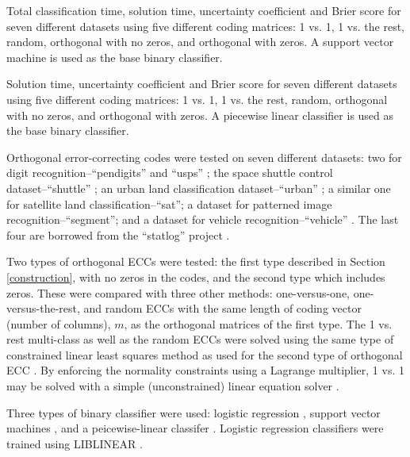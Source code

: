 \begin{table*}
\caption{Total classification time, solution time, uncertainty coefficient and Brier score for seven different datasets using five different coding matrices: 1 vs. 1, 1 vs. the rest, random, orthogonal with no zeros, and orthogonal with zeros. A support vector machine is used as the base binary classifier.}\label{class_results_svm}

\end{table*}

\begin{table*}
\caption{Solution time, uncertainty coefficient and Brier score for seven different datasets using five different coding matrices: 1 vs. 1, 1 vs. the rest, random, orthogonal with no zeros, and orthogonal with zeros. A piecewise linear classifier is used as the base binary classifier.}\label{class_results_acc}

\end{table*}

Orthogonal error-correcting codes were tested on seven different datasets:
two for digit recognition--``pendigits'' \citep{Alimoglu1996} and
``usps'' \citep{Hull1994}; the space shuttle control dataset--``shuttle''
\citep{King_etal1995}; 
an urban land classification dataset--``urban'' \citep{Johnson2013};
a similar one for satellite land classification--``sat''; 
a dataset for patterned image recognition--``segment'';
and a dataset for vehicle recognition--``vehicle'' \citep{Siebert1987}.
The last four are borrowed from the ``statlog'' project \citep{King_etal1995,Michie_etal1994}.

Two types of orthogonal ECCs were tested: the first type described in
Section \ref{construction}, with no zeros in the codes, and the second type which includes
zeros.
These were compared with three other methods: one-versus-one, one-versus-the-rest,
and random ECCs with the same length of coding vector (number of columns), $m$,
as the orthogonal matrices of the first type.
The 1 vs. rest multi-class as well as the random ECCs were solved using 
the same type of constrained linear least squares method as used for the
second type of orthogonal ECC \citep{Lawson_Hanson1995}.
By enforcing the normality constraints using a Lagrange multiplier,
1 vs. 1 may be solved with a simple (unconstrained) linear equation solver \citep{Wu_etal2004}.

Three types of binary classifier were used: logistic regression \citep{Michie_etal1994},
support vector machines \citep{Mueller_etal2001},
and a peicewise-linear classifer \citep{Mills2018}.
Logistic regression classifiers were trained using LIBLINEAR \citep{Fan_etal2008}.


